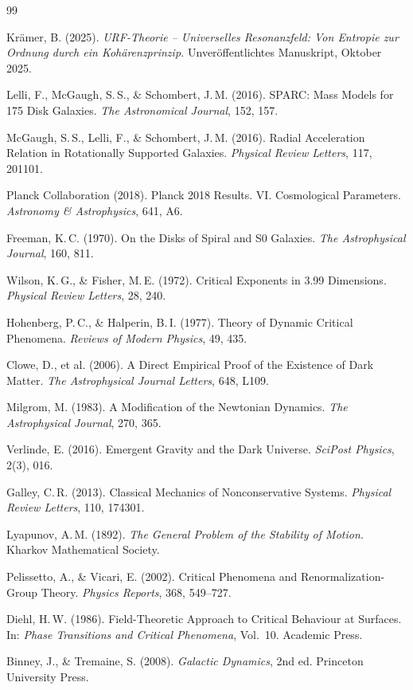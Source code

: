\documentclass[12pt,a4paper]{article}
\theoremstyle{definition}
\begin{document}
\begin{thebibliography}{99}

Krämer, B. (2025).
\textit{URF-Theorie -- Universelles Resonanzfeld: Von Entropie zur Ordnung durch ein Kohärenzprinzip.}
Unveröffentlichtes Manuskript, Oktober 2025.

Lelli, F., McGaugh, S.\,S., \& Schombert, J.\,M. (2016).
SPARC: Mass Models for 175 Disk Galaxies.
\textit{The Astronomical Journal}, 152, 157.

McGaugh, S.\,S., Lelli, F., \& Schombert, J.\,M. (2016).
Radial Acceleration Relation in Rotationally Supported Galaxies.
\textit{Physical Review Letters}, 117, 201101.

Planck Collaboration (2018).
Planck 2018 Results. VI. Cosmological Parameters.
\textit{Astronomy \& Astrophysics}, 641, A6.

Freeman, K.\,C. (1970).
On the Disks of Spiral and S0 Galaxies.
\textit{The Astrophysical Journal}, 160, 811.

Wilson, K.\,G., \& Fisher, M.\,E. (1972).
Critical Exponents in 3.99 Dimensions.
\textit{Physical Review Letters}, 28, 240.

Hohenberg, P.\,C., \& Halperin, B.\,I. (1977).
Theory of Dynamic Critical Phenomena.
\textit{Reviews of Modern Physics}, 49, 435.

Clowe, D., et al. (2006).
A Direct Empirical Proof of the Existence of Dark Matter.
\textit{The Astrophysical Journal Letters}, 648, L109.

Milgrom, M. (1983).
A Modification of the Newtonian Dynamics.
\textit{The Astrophysical Journal}, 270, 365.

Verlinde, E. (2016).
Emergent Gravity and the Dark Universe.
\textit{SciPost Physics}, 2(3), 016.

Galley, C.\,R. (2013).
Classical Mechanics of Nonconservative Systems.
\textit{Physical Review Letters}, 110, 174301.

Lyapunov, A.\,M. (1892).
\textit{The General Problem of the Stability of Motion.}
Kharkov Mathematical Society.

Pelissetto, A., \& Vicari, E. (2002).
Critical Phenomena and Renormalization-Group Theory.
\textit{Physics Reports}, 368, 549--727.

Diehl, H.\,W. (1986).
Field-Theoretic Approach to Critical Behaviour at Surfaces.
In: \textit{Phase Transitions and Critical Phenomena}, Vol.~10. Academic Press.

Binney, J., \& Tremaine, S. (2008).
\textit{Galactic Dynamics}, 2nd ed. Princeton University Press.

\end{thebibliography}
\end{document}
